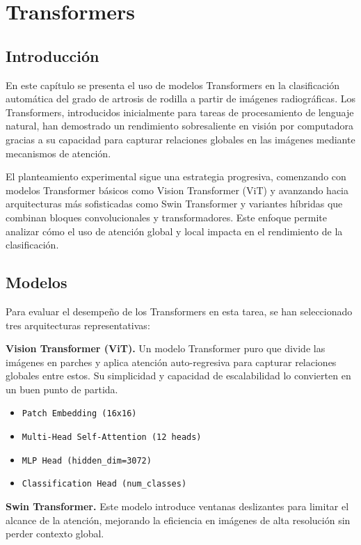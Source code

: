 \documentclass[11pt,spanish,listoffigures,listoftables]{tfgetsinf}
\begin{document}
\chapter{Transformers}
\label{chap:transformers}

\section{Introducción}
En este capítulo se presenta el uso de modelos Transformers en la clasificación automática del grado de artrosis de rodilla a partir de imágenes radiográficas. Los Transformers, 
introducidos inicialmente para tareas de procesamiento de lenguaje natural, han demostrado un rendimiento sobresaliente en visión por computadora gracias a su capacidad para capturar 
relaciones globales en las imágenes mediante mecanismos de atención.

El planteamiento experimental sigue una estrategia progresiva, comenzando con modelos Transformer básicos como Vision Transformer (ViT) y avanzando hacia arquitecturas más sofisticadas 
como Swin Transformer y variantes híbridas que combinan bloques convolucionales y transformadores. Este enfoque permite analizar cómo el uso de atención global y local impacta en el 
rendimiento de la clasificación.

\section{Modelos}
Para evaluar el desempeño de los Transformers en esta tarea, se han seleccionado tres arquitecturas representativas:

\textbf{Vision Transformer (ViT).}
Un modelo Transformer puro que divide las imágenes en parches y aplica atención auto-regresiva para capturar relaciones globales entre estos. Su simplicidad y 
capacidad de escalabilidad lo convierten en un buen punto de partida.

\begin{itemize}
\item 	\texttt{Patch Embedding (16x16)}
\item 	\texttt{Multi-Head Self-Attention (12 heads)}
\item 	\texttt{MLP Head (hidden\_dim=3072)}
\item 	\texttt{Classification Head (num\_classes)}
\end{itemize}

\textbf{Swin Transformer.}
Este modelo introduce ventanas deslizantes para limitar el alcance de la atención, mejorando la eficiencia en imágenes de alta resolución sin perder contexto global.
\end{document}
